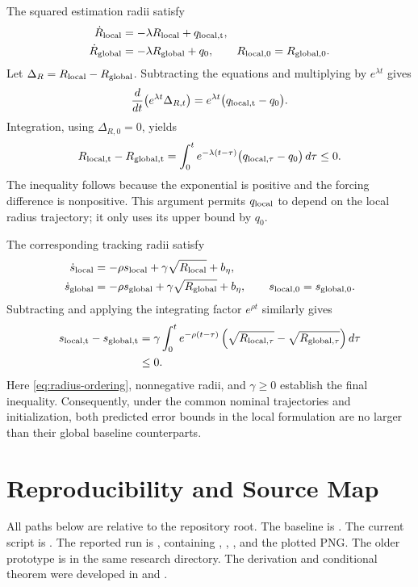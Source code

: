 \documentclass[11pt,a4paper]{article}
\numberwithin{equation}{section}
\theoremstyle{remark}\newtheorem{remark}{Remark}
\begin{document}
The squared estimation radii satisfy
\begin{align}
\dot R_{\rm local}&=-\lambda R_{\rm local}+q_{\rm local,t},\\
\dot R_{\rm global}&=-\lambda R_{\rm global}+q_0,
\qquad R_{\rm local,0}=R_{\rm global,0}.
\end{align}
Let $\Delta_R=R_{\rm local}-R_{\rm global}$. Subtracting the equations and multiplying by $e^{\lambda t}$ gives
\[
\frac{d}{dt}\bigl(e^{\lambda t}\Delta_{R,t}\bigr)
=e^{\lambda t}\bigl(q_{\rm local,t}-q_0\bigr).
\]
Integration, using $\Delta_{R,0}=0$, yields
\begin{equation}\label{eq:radius-ordering}
R_{\rm local,t}-R_{\rm global,t}
=\int_0^t e^{-\lambda(t-\tau)}\bigl(q_{\rm local,\tau}-q_0\bigr)\,d\tau
\le0.
\end{equation}
The inequality follows because the exponential is positive and the forcing difference is nonpositive. This argument permits $q_{\rm local}$ to depend on the local radius trajectory; it only uses its upper bound by $q_0$.

The corresponding tracking radii satisfy
\begin{align}
\dot s_{\rm local}&=-\rho s_{\rm local}+\gamma\sqrt{R_{\rm local}}+b_\eta,\\
\dot s_{\rm global}&=-\rho s_{\rm global}+\gamma\sqrt{R_{\rm global}}+b_\eta,
\qquad s_{\rm local,0}=s_{\rm global,0}.
\end{align}
Subtracting and applying the integrating factor $e^{\rho t}$ similarly gives
\begin{equation}\label{eq:tracking-radius-ordering}
\begin{aligned}
s_{\rm local,t}-s_{\rm global,t}
&=\gamma\int_0^t e^{-\rho(t-\tau)}
\left(\sqrt{R_{\rm local,\tau}}-\sqrt{R_{\rm global,\tau}}\right)d\tau\\
&\le0.
\end{aligned}
\end{equation}
Here \eqref{eq:radius-ordering}, nonnegative radii, and $\gamma\ge0$ establish the final inequality. Consequently, under the common nominal trajectories and initialization, both predicted error bounds in the local formulation are no larger than their global baseline counterparts.
\iffalse
\section{Reproducibility and Source Map}
All paths below are relative to the repository root. The baseline is
.
The current script is .
The reported run is , containing , , , and the plotted PNG. The older prototype is  in the same research directory. The derivation and conditional theorem were developed in  and .
\end{document}
